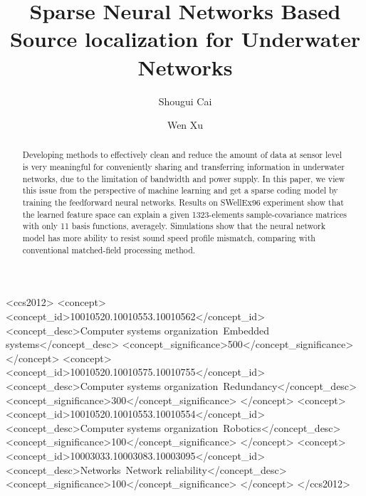 \documentclass[sigconf]{acmart}
\begin{document}
\title{
Sparse Neural Networks Based Source localization for Underwater Networks %
}
\author{Shougui Cai}

\author{Wen Xu}

\renewcommand{\shortauthors}{Shougui Cai.}


\begin{abstract}
Developing methods to effectively clean and reduce the amount of data at sensor level is very meaningful for conveniently sharing and transferring information in underwater networks, due to the limitation of bandwidth and power supply. In this paper, we view this issue from the perspective of machine learning
and get a sparse coding model by training the feedforward neural networks.
Results on SWellEx96 experiment show that the learned feature space can explain a given 1323-elements sample-covariance matrices with only 11 basis functions, averagely.
Simulations show that the neural network model has more ability to resist sound speed profile mismatch, comparing with conventional matched-field processing method.
\end{abstract}

%
%
\begin{CCSXML}
<ccs2012>
 <concept>
  <concept_id>10010520.10010553.10010562</concept_id>
  <concept_desc>Computer systems organization~Embedded systems</concept_desc>
  <concept_significance>500</concept_significance>
 </concept>
 <concept>
  <concept_id>10010520.10010575.10010755</concept_id>
  <concept_desc>Computer systems organization~Redundancy</concept_desc>
  <concept_significance>300</concept_significance>
 </concept>
 <concept>
  <concept_id>10010520.10010553.10010554</concept_id>
  <concept_desc>Computer systems organization~Robotics</concept_desc>
  <concept_significance>100</concept_significance>
 </concept>
 <concept>
  <concept_id>10003033.10003083.10003095</concept_id>
  <concept_desc>Networks~Network reliability</concept_desc>
  <concept_significance>100</concept_significance>
 </concept>
</ccs2012>
\end{CCSXML}
\end{document}

